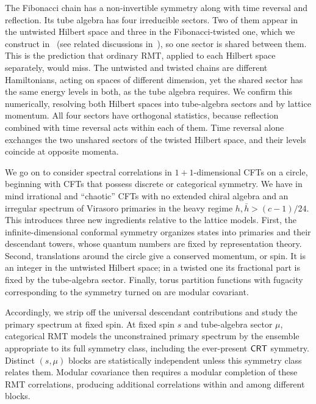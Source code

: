 \documentclass[11pt]{article}
\numberwithin{equation}{section}
\begin{document}
The Fibonacci chain has a non-invertible symmetry along with time reversal and reflection. Its tube algebra has four irreducible sectors. Two of them appear in the untwisted Hilbert space and three in the Fibonacci-twisted one, which we construct in~\cite{Jensen:2026cat} (see related discussions in~\cite{Buican:2017rxc,Aasen:2020jwb}), so one sector is shared between them. This is the prediction that ordinary RMT, applied to each Hilbert space separately, would miss. The untwisted and twisted chains are different Hamiltonians, acting on spaces of different dimension, yet the shared sector has the same energy levels in both, as the tube algebra requires. We confirm this numerically, resolving both Hilbert spaces into tube-algebra sectors and by lattice momentum. All four sectors have orthogonal statistics, because reflection combined with time reversal acts within each of them. Time reversal alone exchanges the two unshared sectors of the twisted Hilbert space, and their levels coincide at opposite momenta.

We go on to consider spectral correlations in $1+1$-dimensional CFTs on a circle, beginning with CFTs that possess discrete or categorical symmetry. We have in mind irrational and ``chaotic'' CFTs with no extended chiral algebra and an irregular spectrum of Virasoro primaries in the heavy regime $h,\bar h>(c-1)/24$. This introduces three new ingredients relative to the lattice models. First, the infinite-dimensional conformal symmetry organizes states into primaries and their descendant towers, whose quantum numbers are fixed by representation theory. Second, translations around the circle give a conserved momentum, or spin. It is an integer in the untwisted Hilbert space; in a twisted one its fractional part is fixed by the tube-algebra sector. Finally, torus partition functions with fugacity corresponding to the symmetry turned on are modular covariant.

Accordingly, we strip off the universal descendant contributions and study the primary spectrum at fixed spin. At fixed spin $s$ and tube-algebra sector $\mu$, categorical RMT models the unconstrained primary spectrum by the ensemble appropriate to its full symmetry class, including the ever-present $\mathsf{CRT}$ symmetry. Distinct $(s,\mu)$ blocks are statistically independent unless this symmetry class relates them. Modular covariance then requires a modular completion of these RMT correlations, producing additional correlations within and among different blocks. 
\end{document}

